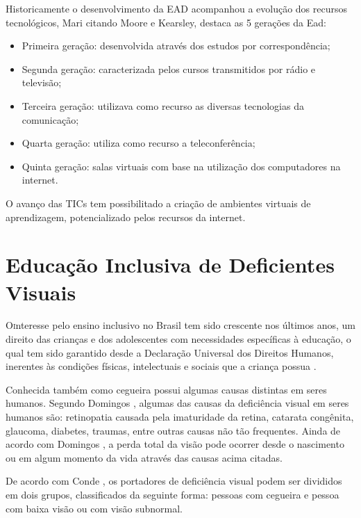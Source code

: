 Historicamente o desenvolvimento da EAD acompanhou a evolução dos recursos tecnológicos, Mari \cite{mari2011avaliaccao} citando Moore e Kearsley, destaca as 5 gerações da Ead:
\begin{itemize}
    \item Primeira geração: desenvolvida através dos estudos por correspondência;
    \item Segunda geração: caracterizada pelos cursos transmitidos por rádio e televisão;
    \item Terceira geração: utilizava como recurso as diversas tecnologias da comunicação;
    \item Quarta geração: utiliza como recurso a teleconferência;
    \item Quinta geração: salas virtuais com base na utilização dos computadores na internet.
\end{itemize}
O avanço das TICs tem possibilitado a criação de ambientes virtuais de aprendizagem, potencializado pelos recursos da internet.

\section{Educação Inclusiva de Deficientes Visuais}
\lettrine{O} interesse pelo ensino inclusivo no Brasil tem sido crescente nos últimos anos, um direito das crianças e dos adolescentes com necessidades específicas à educação, o qual tem sido garantido desde a Declaração Universal dos Direitos Humanos, inerentes às condições físicas, intelectuais e sociais que a criança possua \cite{de1994linha}.

Conhecida também como cegueira possui algumas causas distintas em seres humanos. Segundo Domingos \cite{domingos2008sexualidade}, algumas das causas da deficiência visual em seres humanos são: retinopatia causada pela imaturidade da retina, catarata congênita, glaucoma, diabetes, traumas, entre outras causas não tão frequentes. Ainda de acordo com Domingos \cite{domingos2008sexualidade}, a perda total da visão pode ocorrer desde o nascimento ou em algum momento da vida através das causas acima citadas.

De acordo com Conde \cite{conde2007definindo}, os portadores de deficiência visual podem ser divididos em dois grupos, classificados da seguinte forma: pessoas com cegueira e pessoa com baixa visão ou com visão subnormal.

